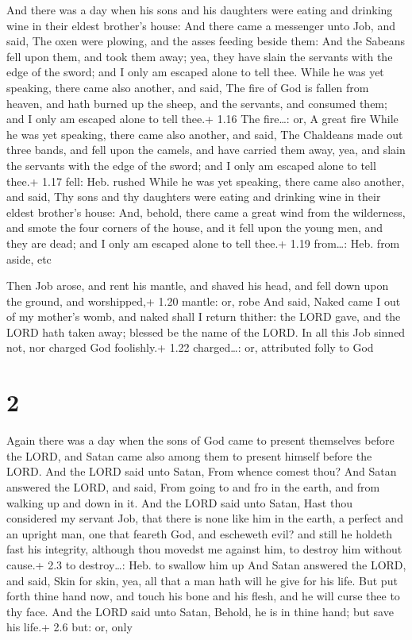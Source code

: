  And there was a day when his sons and his daughters were
eating and drinking wine in their eldest brother's house: 
And there came a messenger unto Job, and said, The oxen were plowing,
and the asses feeding beside them:  And the Sabeans fell
upon them, and took them away; yea, they have slain the servants with
the edge of the sword; and I only am escaped alone to tell thee.
 While he was yet speaking, there came also another, and
said, The fire of God is fallen from heaven, and hath burned up the
sheep, and the servants, and consumed them; and I only am escaped alone
to tell thee.+ 1.16 The fire\ldots: or, A great fire  While
he was yet speaking, there came also another, and said, The Chaldeans
made out three bands, and fell upon the camels, and have carried them
away, yea, and slain the servants with the edge of the sword; and I only
am escaped alone to tell thee.+ 1.17 fell: Heb. rushed 
While he was yet speaking, there came also another, and said, Thy sons
and thy daughters were eating and drinking wine in their eldest
brother's house:  And, behold, there came a great wind from
the wilderness, and smote the four corners of the house, and it fell
upon the young men, and they are dead; and I only am escaped alone to
tell thee.+ 1.19 from\ldots: Heb. from aside, etc

 Then Job arose, and rent his mantle, and shaved his head,
and fell down upon the ground, and worshipped,+ 1.20 mantle: or, robe
 And said, Naked came I out of my mother's womb, and naked
shall I return thither: the LORD gave, and the LORD hath taken away;
blessed be the name of the LORD.  In all this Job sinned
not, nor charged God foolishly.+ 1.22 charged\ldots: or, attributed
folly to God

\hypertarget{section-1}{%
\section{2}\label{section-1}}

 Again there was a day when the sons of God came to present
themselves before the LORD, and Satan came also among them to present
himself before the LORD.  And the LORD said unto Satan, From
whence comest thou? And Satan answered the LORD, and said, From going to
and fro in the earth, and from walking up and down in it. 
And the LORD said unto Satan, Hast thou considered my servant Job, that
there is none like him in the earth, a perfect and an upright man, one
that feareth God, and escheweth evil? and still he holdeth fast his
integrity, although thou movedst me against him, to destroy him without
cause.+ 2.3 to destroy\ldots: Heb. to swallow him up  And
Satan answered the LORD, and said, Skin for skin, yea, all that a man
hath will he give for his life.  But put forth thine hand
now, and touch his bone and his flesh, and he will curse thee to thy
face.  And the LORD said unto Satan, Behold, he is in thine
hand; but save his life.+ 2.6 but: or, only

